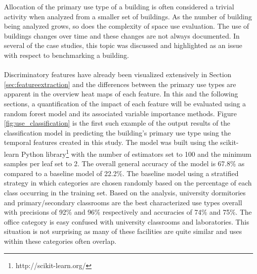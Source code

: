 Allocation of the primary use type of a building is often considered a trivial activity when analyzed from a smaller set of buildings. As the number of building being analyzed grows, so does the complexity of space use evaluation. The use of buildings changes over time and these changes are not always documented. In several of the case studies, this topic was discussed and highlighted as an issue with respect to benchmarking a building.\\
\\
Discriminatory features have already been visualized extensively in Section \ref{sec:featureextraction} and the differences between the primary use types are apparent in the overview heat maps of each feature. In this and the following sections, a quantification of the impact of each feature will be evaluated using a random forest model and its associated variable importance methods. Figure \ref{fig:use_classification} is the first such example of the output results of the classification model in predicting the building's primary use type using the temporal features created in this study. The model was built using the scikit-learn Python library\footnote{http://scikit-learn.org/} with the number of estimators set to 100 and the minimum samples per leaf set to 2. The overall general accuracy of the model is 67.8\% as compared to a baseline model of 22.2\%. The baseline model using a stratified strategy in which categories are chosen randomly based on the percentage of each class occurring in the training set. Based on the analysis, university dormitories and primary/secondary classrooms are the best characterized use types overall with precisions of 92\% and 96\% respectively and accuracies of 74\% and 75\%. The office category is easy confused with university classrooms and laboratories. This situation is not surprising as many of these facilities are quite similar and uses within these categories often overlap. 